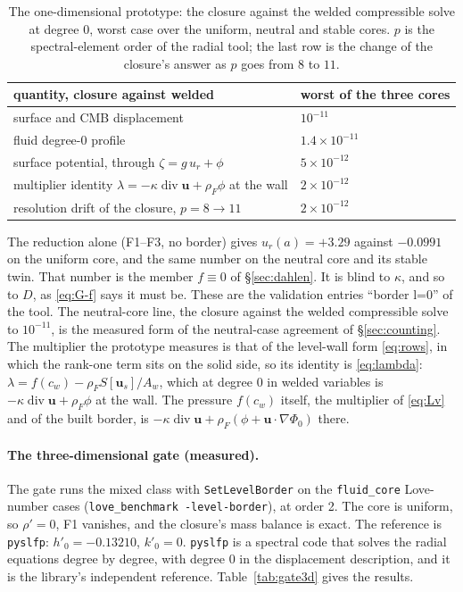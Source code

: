 \documentclass[11pt]{article}
\theoremstyle{definition}
\theoremstyle{remark}
\newcommand{\bu}{\mathbf{u}}
\newcommand{\Div}{\operatorname{div}}
\newcommand{\code}[1]{\texttt{#1}}
\begin{document}
\begin{table}[htbp]
\centering
\small
\caption{The one-dimensional prototype: the closure against the welded
compressible solve at degree $0$, worst case over the uniform, neutral
and stable cores. $p$ is the spectral-element order of the radial
tool; the last row is the change of the closure's answer as $p$ goes
from $8$ to $11$.}
\label{tab:prototype}
\begin{tabular}{@{}ll@{}}
\toprule
quantity, closure against welded & worst of the three cores \\
\midrule
surface and CMB displacement & $10^{-11}$ \\
fluid degree-0 profile & $1.4\times10^{-11}$ \\
surface potential, through $\zeta = g\,u_r + \phi$ & $5\times10^{-12}$ \\
multiplier identity $\lambda = -\kappa\Div\bu + \rho_F\phi$ at the wall & $2\times10^{-12}$ \\
resolution drift of the closure, $p = 8 \to 11$ & $2\times10^{-12}$ \\
\bottomrule
\end{tabular}
\end{table}

The reduction alone (F1--F3, no border) gives $u_r(a) = +3.29$ against
$-0.0991$ on the uniform core, and the same number on the neutral core
and its stable twin. That number is the member $f \equiv 0$ of
\S\ref{sec:dahlen}. It is blind to $\kappa$, and so to $D$, as
\eqref{eq:G-f} says it must be. These are the validation entries
``border l=0'' of the tool. The neutral-core line, the closure against
the welded compressible solve to $10^{-11}$, is the measured form of
the neutral-case agreement of \S\ref{sec:counting}. The multiplier the
prototype measures is that of the level-wall form \eqref{eq:rows}, in
which the rank-one term sits on the solid side, so its identity is
\eqref{eq:lambda}: $\lambda = f(c_w) - \rho_FS[\bu_s]/A_w$, which at
degree 0 in welded variables is $-\kappa\Div\bu + \rho_F\phi$ at the
wall. The pressure $f(c_w)$ itself, the multiplier of \eqref{eq:Lv} and
of the built border, is $-\kappa\Div\bu + \rho_F(\phi +
\bu\cdot\nabla\Phi_0)$ there.

\paragraph{The three-dimensional gate (measured).} The gate runs the
mixed class with \code{SetLevelBorder} on the \code{fluid\_core}
Love-number cases (\code{love\_benchmark -level-border}), at order 2.
The core is uniform, so $\rho' = 0$, F1 vanishes, and the closure's
mass balance is exact. The reference is \code{pyslfp}: $h'_0 =
-0.13210$, $k'_0 = 0$. \code{pyslfp} is a spectral code that solves
the radial equations degree by degree, with degree $0$ in the
displacement description, and it is the library's independent
reference. Table~\ref{tab:gate3d} gives the results.
\end{document}

